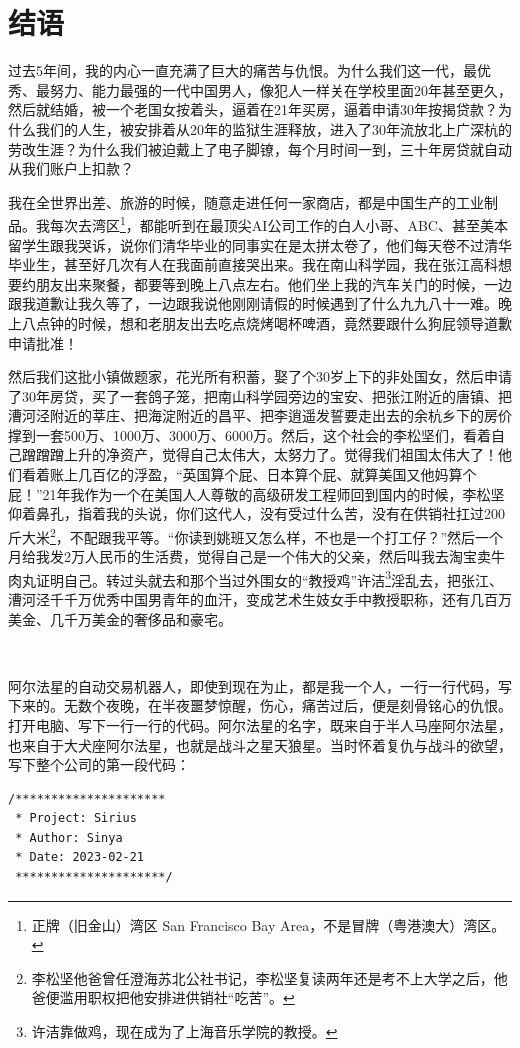 \chapter{结语}

过去5年间，我的内心一直充满了巨大的痛苦与仇恨。为什么我们这一代，最优秀、最努力、能力最强的一代中国男人，像犯人一样关在学校里面20年甚至更久，然后就结婚，被一个老国女按着头，逼着在21年买房，逼着申请30年按揭贷款？为什么我们的人生，被安排着从20年的监狱生涯释放，进入了30年流放北上广深杭的劳改生涯？为什么我们被迫戴上了电子脚镣，每个月时间一到，三十年房贷就自动从我们账户上扣款？

我在全世界出差、旅游的时候，随意走进任何一家商店，都是中国生产的工业制品。我每次去湾区\footnote{正牌（旧金山）湾区 San Francisco Bay Area，不是冒牌（粤港澳大）湾区。}，都能听到在最顶尖AI公司工作的白人小哥、ABC、甚至美本留学生跟我哭诉，说你们清华毕业的同事实在是太拼太卷了，他们每天卷不过清华毕业生，甚至好几次有人在我面前直接哭出来。我在南山科学园，我在张江高科想要约朋友出来聚餐，都要等到晚上八点左右。他们坐上我的汽车关门的时候，一边跟我道歉让我久等了，一边跟我说他刚刚请假的时候遇到了什么九九八十一难。晚上八点钟的时候，想和老朋友出去吃点烧烤喝杯啤酒，竟然要跟什么狗屁领导道歉申请批准！

然后我们这批小镇做题家，花光所有积蓄，娶了个30岁上下的非处国女，然后申请了30年房贷，买了一套鸽子笼，把南山科学园旁边的宝安、把张江附近的唐镇、把漕河泾附近的莘庄、把海淀附近的昌平、把李逍遥发誓要走出去的余杭乡下的房价撑到一套500万、1000万、3000万、6000万。然后，这个社会的李松坚们，看着自己蹭蹭蹭上升的净资产，觉得自己太伟大，太努力了。觉得我们祖国太伟大了！他们看着账上几百亿的浮盈，``英国算个屁、日本算个屁、就算美国又他妈算个屁！''21年我作为一个在美国人人尊敬的高级研发工程师回到国内的时候，李松坚仰着鼻孔，指着我的头说，你们这代人，没有受过什么苦，没有在供销社扛过200斤大米\footnote{李松坚他爸曾任澄海苏北公社书记，李松坚复读两年还是考不上大学之后，他爸便滥用职权把他安排进供销社``吃苦''。}，不配跟我平等。``你读到姚班又怎么样，不也是一个打工仔？''然后一个月给我发2万人民币的生活费，觉得自己是一个伟大的父亲，然后叫我去淘宝卖牛肉丸证明自己。转过头就去和那个当过外围女的``教授鸡''许洁\footnote{许洁靠做鸡，现在成为了上海音乐学院的教授。}淫乱去，把张江、漕河泾千千万优秀中国男青年的血汗，变成艺术生妓女手中教授职称，还有几百万美金、几千万美金的奢侈品和豪宅。

\ 

阿尔法星的自动交易机器人，即使到现在为止，都是我一个人，一行一行代码，写下来的。无数个夜晚，在半夜噩梦惊醒，伤心，痛苦过后，便是刻骨铭心的仇恨。打开电脑、写下一行一行的代码。阿尔法星的名字，既来自于半人马座阿尔法星，也来自于大犬座阿尔法星，也就是战斗之星天狼星。当时怀着复仇与战斗的欲望，写下整个公司的第一段代码：\begin{verbatim}
/*********************
 * Project: Sirius
 * Author: Sinya
 * Date: 2023-02-21
 *********************/
\end{verbatim}


